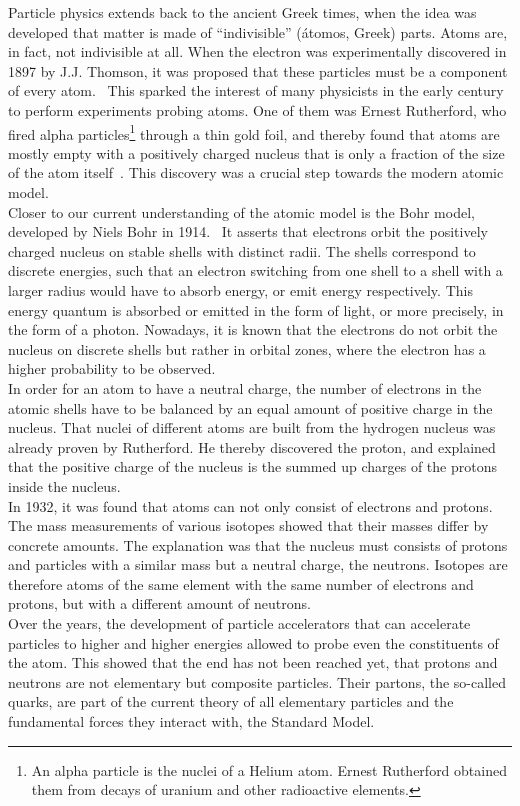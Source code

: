Particle physics extends back to the ancient Greek times, when the idea was developed that matter is made of ``indivisible'' (\'atomos, Greek) parts.
Atoms are, in fact, not indivisible at all.
When the electron was experimentally discovered in 1897 by J.J. Thomson, it was proposed that these particles must be a component of every atom.~\cite[p. 13ff]{Griffiths}
This sparked the interest of many physicists in the early  century to perform experiments probing atoms.
One of them was Ernest Rutherford, who fired alpha particles\footnote{An alpha particle is the nuclei of a Helium atom. Ernest Rutherford obtained them from decays of uranium and other radioactive elements.} through a thin gold foil, and thereby found that atoms are mostly empty with a positively charged nucleus that is only a fraction of the size of the atom itself~\cite{GoldFoil}.
This discovery was a crucial step towards the modern atomic model.\\
Closer to our current understanding of the atomic model is the Bohr model, developed by Niels Bohr in 1914.~\cite[p. 15]{Griffiths}
It asserts that electrons orbit the positively charged nucleus on stable shells with distinct radii.
The shells correspond to discrete energies, such that an electron switching from one shell to a shell with a larger radius would have to absorb energy, or emit energy respectively.
This energy quantum is absorbed or emitted in the form of light, or more precisely, in the form of a photon.
Nowadays, it is known that the electrons do not orbit the nucleus on discrete shells but rather in orbital zones, where the electron has a higher probability to be observed.\\
In order for an atom to have a neutral charge, the number of electrons in the atomic shells have to be balanced by an equal amount of positive charge in the nucleus.
That nuclei of different atoms are built from the hydrogen nucleus was already proven by Rutherford.
He thereby discovered the proton, and explained that the positive charge of the nucleus is the summed up charges of the protons inside the nucleus.\\
In 1932, it was found that atoms can not only consist of electrons and protons.~\cite[p. 15]{Griffiths}
The mass measurements of various isotopes showed that their masses differ by concrete amounts.
The explanation was that the nucleus must consists of protons and particles with a similar mass but a neutral charge, the neutrons.
Isotopes are therefore atoms of the same element with the same number of electrons and protons, but with a different amount of neutrons.\\
Over the years, the development of particle accelerators that can accelerate particles to higher and higher energies allowed to probe even the constituents of the atom.
This showed that the end has not been reached yet, that protons and neutrons are not elementary but composite particles.
Their partons, the so-called quarks, are part of the current theory of all elementary particles and the fundamental forces they interact with, the Standard Model.

